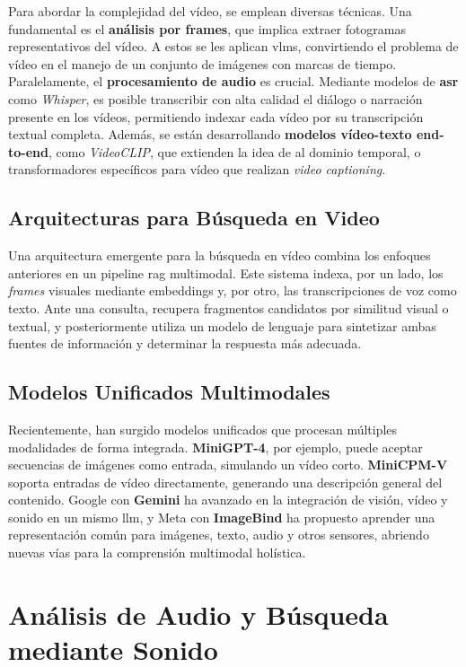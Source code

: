 Para abordar la complejidad del vídeo, se emplean diversas técnicas. Una fundamental es el \textbf{análisis por frames}, que implica extraer fotogramas representativos del vídeo. A estos se les aplican \glspl{vlm}, convirtiendo el problema de vídeo en el manejo de un conjunto de imágenes con marcas de tiempo. Paralelamente, el \textbf{procesamiento de audio} es crucial. Mediante modelos de \textbf{\gls{asr}} como \emph{Whisper}, es posible transcribir con alta calidad el diálogo o narración presente en los vídeos, permitiendo indexar cada vídeo por su transcripción textual completa. Además, se están desarrollando \textbf{modelos vídeo-texto end-to-end}, como \emph{VideoCLIP}, que extienden la idea de  al dominio temporal, o transformadores específicos para vídeo que realizan \emph{video captioning}.

\subsection{Arquitecturas para Búsqueda en Video}

Una arquitectura emergente para la búsqueda en vídeo combina los enfoques anteriores en un pipeline \gls{rag} multimodal. Este sistema indexa, por un lado, los \emph{frames} visuales mediante embeddings y, por otro, las transcripciones de voz como texto. Ante una consulta, recupera fragmentos candidatos por similitud visual o textual, y posteriormente utiliza un modelo de lenguaje para sintetizar ambas fuentes de información y determinar la respuesta más adecuada.

\subsection{Modelos Unificados Multimodales}

Recientemente, han surgido modelos unificados que procesan múltiples modalidades de forma integrada. \textbf{MiniGPT-4}, por ejemplo, puede aceptar secuencias de imágenes como entrada, simulando un vídeo corto. \textbf{MiniCPM-V} soporta entradas de vídeo directamente, generando una descripción general del contenido. Google con \textbf{Gemini} ha avanzado en la integración de visión, vídeo y sonido en un mismo \gls{llm}, y Meta con \textbf{ImageBind} ha propuesto aprender una representación común para imágenes, texto, audio y otros sensores, abriendo nuevas vías para la comprensión multimodal holística.

\section{Análisis de Audio y Búsqueda mediante Sonido}

